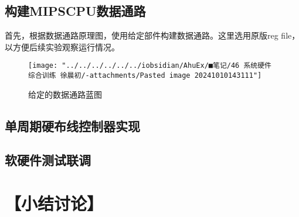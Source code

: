 \documentclass[withoutpreface]{cumcmthesis}
\begin{document}
\subsection{构建MIPSCPU数据通路}
首先，根据数据通路原理图，使用给定部件构建数据通路。这里选用原版reg file，以方便后续实验观察运行情况。
\begin{figure}[!h]
	\centering
	\texttt{[image: "../../../../../../iobsidian/AhuEx/■笔记/46 系统硬件综合训练 徐晨初/-attachments/Pasted image 20241010143111"]}
	\caption{给定的数据通路蓝图}
	\label{fig:pasted-image-20241010143111}
\end{figure}


\subsection{单周期硬布线控制器实现}

\subsection{软硬件测试联调}


\section{【小结讨论】}
\end{document}
